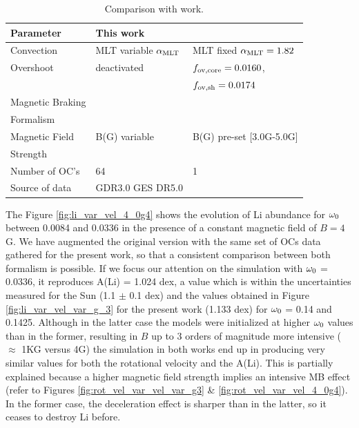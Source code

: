 \documentclass[fleqn,usenatbib]{mnras}
\begin{document}
\begin{table}
	\centering
    \begin{threeparttable}
	\begin{tabular}{lll} 
		\hline
		Parameter & This work & \citet{Caballero2020}\\
		\hline
		Convection & MLT variable $\alpha_{{\rm MLT}}$ & MLT fixed $\alpha_{{\rm MLT}}=1.82$\\
            Overshoot & deactivated & $f_{{\rm ov,core}}=0.0160$,\\ & & $f_{{\rm ov,sh}}=0.0174$\\
		Magnetic Braking & \citet{Gallet2013} & \citet{Ud-Doula2008} \\ Formalism & & \\
		Magnetic Field & B(G) variable & B(G) pre-set [3.0G-5.0G]\\ Strength & & \\
            Number of OC's & 64 & 1 \\
            Source of data & GDR3.0 GES DR5.0 & \citet{Sestito2005} \\
		\hline
	\end{tabular}
    \end{threeparttable}
    \caption{Comparison with \citet{Caballero2020} work.} \label{tab:caballero2024_2020}
\end{table}

The Figure \ref{fig:li_var_vel_4_0g4} shows the evolution of Li abundance for $\omega_{\mathrm{0}}$ between 0.0084 and 0.0336 in the presence of a constant magnetic field of $B=4$G. We have augmented the original version with the same set of OCs data gathered for the present work, so that a consistent comparison between both formalism is possible. If we focus our attention on the simulation with $\omega_{\mathrm{0}}$ = 0.0336, it reproduces  A(Li) = 1.024 dex, a value which is within the uncertainties measured for the Sun (1.1 $\pm$ 0.1 dex) and the values obtained in Figure \ref{fig:li_var_vel_var_g_3} for the present work (1.133 dex) for $\omega_{\mathrm{0}}$ = 0.14 and 0.1425. Although in the latter case the models were initialized at higher $\omega_{\mathrm{0}}$ values than in the former, resulting in $B$ up to 3 orders of magnitude more intensive ($\approx$ 1KG versus 4G) the simulation in both works end up in producing very similar values for both the rotational velocity and the A(Li). This is partially explained because a higher magnetic field strength implies an intensive MB effect (refer to Figures \ref{fig:rot_vel_var_vel_var_g3} \& \ref{fig:rot_vel_var_vel_4_0g4}). In the former case, the deceleration effect is sharper than in the latter, so it ceases to destroy Li before.\par
\end{document}
